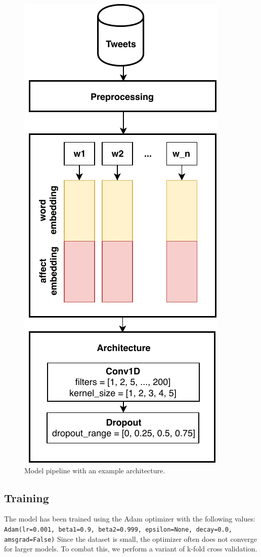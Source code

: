 \documentclass[10pt, a4paper]{article}
\begin{document}
\begin{figure}
\begin{center}
\includegraphics[width=0.7\columnwidth]{images/architecture.pdf}
\caption{Model pipeline with an example architecture.}
\label{fig:figure1}
\end{center}
\end{figure}


\subsection{Training}
The model has been trained using the Adam optimizer with the following values:
\texttt{Adam(lr=0.001, beta1=0.9, beta2=0.999, epsilon=None, decay=0.0, amsgrad=False)}
Since the dataset is small, the optimizer often does not converge for larger models.
To combat this, we perform a variant of k-fold cross validation.
\end{document}
